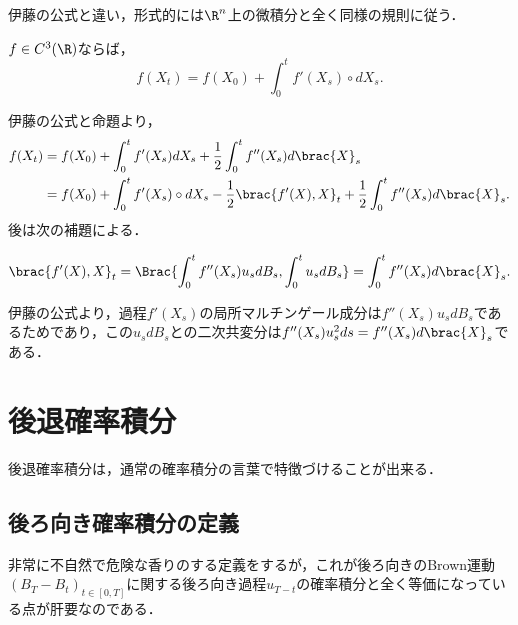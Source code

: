 \documentclass[uplatex,dvipdfmx]{jsreport}
\begin{document}
\begin{tcolorbox}[colframe=ForestGreen, colback=ForestGreen!10!white,breakable,colbacktitle=ForestGreen!40!white,coltitle=black,fonttitle=\bfseries\sffamily,
title=]
    伊藤の公式と違い，形式的には$\R^n$上の微積分と全く同様の規則に従う．
\end{tcolorbox}

\begin{proposition}
    $f\in C^3(\R)$ならば，
    \[f(X_t)=f(X_0)+\int^t_0f'(X_s)\circ dX_s.\]
\end{proposition}
\begin{Proof}
    伊藤の公式と命題より，
    \begin{align*}
        f(X_t)&=f(X_0)+\int^t_0f'(X_s)dX_s+\frac{1}{2}\int^t_0f''(X_s)d\brac{X}_s\\
        &=f(X_0)+\int^t_0f'(X_s)\circ dX_s-\frac{1}{2}\brac{f'(X),X}_t+\frac{1}{2}\int^t_0f''(X_s)d\brac{X}_s.
    \end{align*}
    後は次の補題による．
\end{Proof}

\begin{lemma}
    \[\brac{f'(X),X}_t=\Brac{\int^t_0f''(X_s)u_sdB_s,\int^t_0u_sdB_s}=\int^t_0f''(X_s)d\brac{X}_s.\]
\end{lemma}
\begin{Proof}
    伊藤の公式より，過程$f'(X_s)$の局所マルチンゲール成分は$f''(X_s)u_sdB_s$であるためであり，この$u_sdB_s$との二次共変分は$f''(X_s)u_s^2ds=f''(X_s)d\brac{X}_s$である．
\end{Proof}

\section{後退確率積分}

\begin{tcolorbox}[colframe=ForestGreen, colback=ForestGreen!10!white,breakable,colbacktitle=ForestGreen!40!white,coltitle=black,fonttitle=\bfseries\sffamily,
title=]
    後退確率積分は，通常の確率積分の言葉で特徴づけることが出来る．
\end{tcolorbox}

\subsection{後ろ向き確率積分の定義}

\begin{tcolorbox}[colframe=ForestGreen, colback=ForestGreen!10!white,breakable,colbacktitle=ForestGreen!40!white,coltitle=black,fonttitle=\bfseries\sffamily,
title=]
    非常に不自然で危険な香りのする定義をするが，これが後ろ向きのBrown運動$(B_T-B_t)_{t\in[0,T]}$に関する後ろ向き過程$u_{T-t}$の確率積分と全く等価になっている点が肝要なのである．
\end{tcolorbox}
\end{document}
